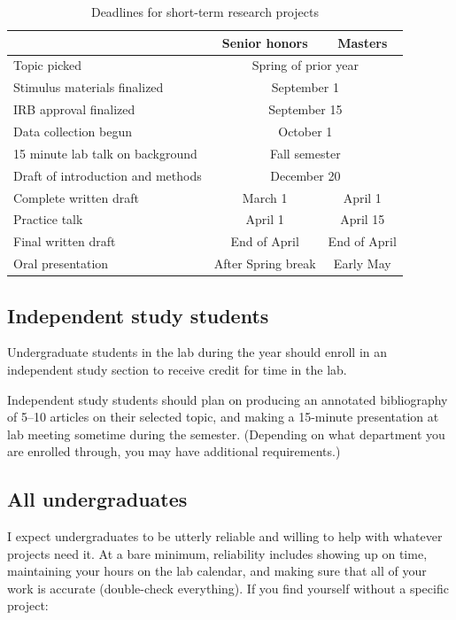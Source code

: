 \documentclass[letterpaper,12pt,oneside]{memoir}
\begin{document}
\begin{table}
\centering
\caption{Deadlines for short-term research projects}
\begin{tabular}{lcc}
\toprule
& Senior honors & Masters\\
\midrule
Topic picked& \multicolumn{2}{c}{Spring of prior year}\\
Stimulus materials finalized& \multicolumn{2}{c}{September 1}\\
IRB approval finalized& \multicolumn{2}{c}{September 15}\\
Data collection begun& \multicolumn{2}{c}{October 1}\\
15 minute lab talk on background& \multicolumn{2}{c}{Fall semester}\\
Draft of introduction and methods& \multicolumn{2}{c}{December 20}\\
Complete written draft& March 1& April 1\\
Practice talk& April 1 & April 15\\
Final written draft& End of April & End of April\\
Oral presentation& After Spring break & Early May\\
\bottomrule
\end{tabular}
\label{table:deadlines}
\end{table}

\subsection{Independent study students}
Undergraduate students in the lab during the year should enroll in an independent study section to receive credit for time in the lab.

Independent study students should plan on producing an annotated bibliography of 5--10 articles on their selected topic, and making a 15-minute presentation at lab meeting sometime during the semester. (Depending on what department you are enrolled through, you may have additional requirements.)



\subsection{All undergraduates}

I expect undergraduates to be utterly reliable and willing to help with whatever projects need it. At a bare minimum, reliability includes showing up on time, maintaining your hours on the lab calendar, and making sure that all of your work is accurate (double-check everything). If you find yourself without a specific project:
\end{document}
